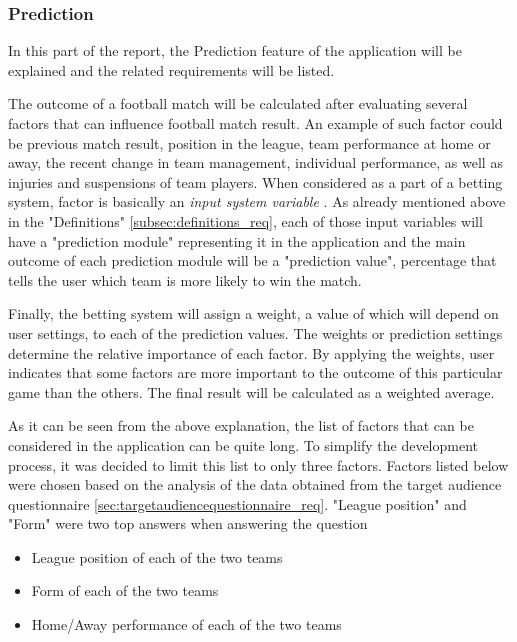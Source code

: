 \subsubsection{Prediction}
\label{subsubsec:prediction_req}
In this part of the report, the Prediction feature of the application will be explained and the related requirements will be listed.

The outcome of a football match will be calculated after evaluating several factors that can influence football match result. An example of such factor could be previous match result, position in the league, team performance at home or away, the recent change in team management, individual performance, as well as injuries and suspensions of team players. When considered as a part of a betting system, factor is basically an \emph{input system variable} \cite{art:simplebettingsystem}. As already mentioned above in the "Definitions" \ref{subsec:definitions_req}, each of those input variables will have a "prediction module" representing it in the application and the main outcome of each prediction module will be a "prediction value", percentage that tells the user which team is more likely to win the match.

Finally, the betting system will assign a weight, a value of which will depend on user settings, to each of the prediction values. The weights or prediction settings determine the relative importance of each factor. By applying the weights, user indicates that some factors are more important to the outcome of this particular game than the others. The final result will be calculated as a weighted average.

As it can be seen from the above explanation, the list of factors that can be considered in the application can be quite long. To simplify the development process, it was decided to limit this list to only three factors. Factors listed below were chosen based on the analysis of the data obtained from the target audience questionnaire \ref{sec:targetaudiencequestionnaire_req}. "League position" and "Form" were two top answers when answering the question

\begin{itemize}
	\item League position of each of the two teams
	\item Form of each of the two teams
	\item Home/Away performance of each of the two teams
\end{itemize}

